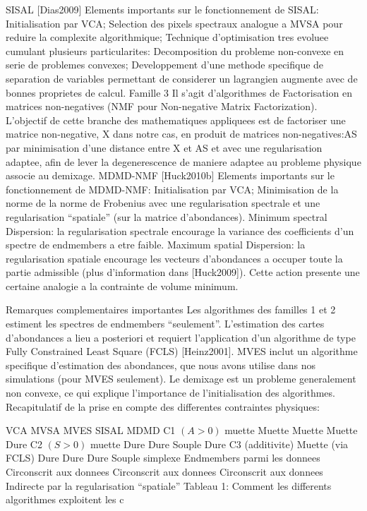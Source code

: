   SISAL [Dias2009]
Elements importants sur le fonctionnement de SISAL: Initialisation
par VCA; 
Selection des pixels spectraux analogue a MVSA pour reduire
la complexite algorithmique; 
Technique d'optimisation tres evoluee
cumulant plusieurs particularites: 
Decomposition du probleme
non-convexe en serie de problemes convexes; 
Developpement d'une
methode specifique de separation de variables permettant de considerer
un lagrangien augmente avec de bonnes proprietes de calcul.  
Famille 3
Il s'agit d'algorithmes de Factorisation en matrices non-negatives
(NMF pour Non-negative Matrix Factorization). L'objectif de cette
branche des mathematiques appliquees est de factoriser une matrice
non-negative, X dans notre cas, en produit de matrices
non-negatives:AS par minimisation d'une distance entre X et AS et
avec une regularisation adaptee, afin de lever la degenerescence de
maniere adaptee au probleme physique associe au demixage.  MDMD-NMF
[Huck2010b] Elements importants sur le fonctionnement de MDMD-NMF:
Initialisation par VCA; 
Minimisation de la norme de la norme de
Frobenius avec une regularisation spectrale et une regularisation
``spatiale'' (sur la matrice d'abondances).  
Minimum spectral
Dispersion: la regularisation spectrale encourage la variance des
coefficients d'un spectre de endmembers a etre faible.  Maximum
spatial Dispersion: la regularisation spatiale encourage les vecteurs
d'abondances a occuper toute la partie admissible (plus d'information
dans [Huck2009]). Cette action presente une certaine analogie a la
contrainte de volume minimum.

Remarques complementaires importantes Les algorithmes des familles 1
et 2 estiment les spectres de endmembers ``seulement''. L'estimation
des cartes d'abondances a lieu a posteriori et requiert l'application
d'un algorithme de type Fully Constrained Least Square (FCLS)
[Heinz2001]. MVES inclut un algorithme specifique d'estimation des
abondances, que nous avons utilise dans nos simulations (pour MVES
seulement).  Le demixage est un probleme generalement non convexe, ce
qui explique l'importance de l'initialisation des algorithmes.
Recapitulatif de la prise en compte des differentes contraintes
physiques:

VCA MVSA MVES SISAL MDMD C1 $(A>0)$ muette Muette Muette Muette Dure C2
$(S>0)$ muette Dure Dure Souple Dure C3 (additivite) Muette (via FCLS)
Dure Dure Dure Souple simplexe Endmembers parmi les donnees
Circonscrit aux donnees Circonscrit aux donnees Circonscrit aux
donnees Indirecte par la regularisation ``spatiale'' Tableau 1:
Comment les differents algorithmes exploitent les c
